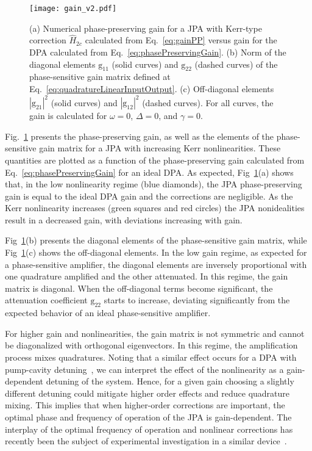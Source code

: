 \documentclass[pra,twocolumn,superscriptaddress]{revtex4-1}
\newcommand{\Grm}[0]{\mathrm{g}}
\begin{document}
% 
\begin{figure}[tb]
	\texttt{[image: gain\_v2.pdf]}
	\caption{
	(a) Numerical phase-preserving gain for a JPA with Kerr-type correction $\hat H_{2c}$ calculated from Eq.~\eqref{eq:gainPP} versus gain  for the DPA calculated from Eq.~\eqref{eq:phasePreservingGain}. 
	(b) Norm of the diagonal elements $\Grm_{11}$ (solid curves) and $\Grm_{22}$ (dashed curves) of the phase-sensitive gain matrix defined at Eq.~\eqref{eq:quadratureLinearInputOutput}. 
	(c) Off-diagonal elements $|\Grm_{21}|^2$ (solid curves) and $|\Grm_{12}|^2$ (dashed curves). 
	For all curves, the gain is calculated for $\omega=0$, $\Delta=0$, and $\gamma=0$.
	}
	\label{fig:gain}
\end{figure}
% 
Fig.~\ref{fig:gain} presents the phase-preserving gain, as well as the elements of the phase-sensitive gain matrix for a JPA with increasing Kerr nonlinearities. 
% 
These quantities are plotted as a function of the phase-preserving gain calculated from Eq.~\eqref{eq:phasePreservingGain} for an ideal DPA. 
% 
As expected, Fig~\ref{fig:gain}(a) shows that, in the low nonlinearity regime (blue diamonds), the JPA phase-preserving gain is equal to the ideal DPA gain and the corrections are negligible. As the Kerr nonlinearity increases (green squares and red circles) the JPA nonidealities result in a decreased gain, with deviations increasing with gain.

Fig~\ref{fig:gain}(b) presents the diagonal elements of the phase-sensitive gain matrix, while Fig~\ref{fig:gain}(c) shows the off-diagonal elements. In the low gain regime, as expected for a phase-sensitive amplifier, the diagonal elements are inversely proportional with one quadrature amplified and the other attenuated. 
In this regime, the gain matrix is diagonal. 
When the off-diagonal terms become significant, the attenuation coefficient $\Grm_{22}$ starts to increase, deviating significantly from the expected behavior of an ideal phase-sensitive amplifier.

For higher gain and nonlinearities, the gain matrix is not symmetric and cannot be diagonalized with orthogonal eigenvectors.
In this regime, the amplification process mixes quadratures. 
% 
 Noting that a similar effect occurs for a DPA with pump-cavity detuning~\cite{Laflamme:2011vn}, we can interpret the effect of the nonlinearity as a gain-dependent detuning of the system. Hence, for a given gain choosing a slightly different detuning could mitigate higher order effects and reduce quadrature mixing. This implies that when higher-order corrections are important, the optimal phase and frequency of operation of the JPA is gain-dependent.
 The interplay of the optimal frequency of operation and nonlinear corrections has recently been the subject of experimental investigation in a similar device~\cite{hatrige2017}.
\end{document}
